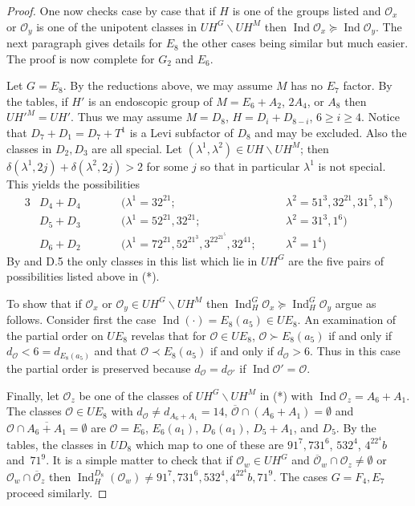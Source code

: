 \documentclass{amsart}
\newcommand\Ind	{\operatorname{Ind}}
\newcommand\lam	{\lambda}
\newcommand\cO		{{\mathcal O}}
\begin{document}
\begin{proof}
One now checks case by case that if $H$ is one of the groups
listed and
$\cO_x$ or $\cO_y$ is one of the unipotent classes in $UH^G
\backslash UH^M$
then $\Ind \cO_x \succeq \Ind \cO_y$.  The next paragraph gives
details for
$E_8$ the other cases being similar but much easier.  The proof
is now
complete for $G_2$ and $E_6$.

Let $G = E_8$.  By the reductions above, we may assume $M$ has no
$E_7$
factor.  By the tables, if $H'$ is an endoscopic group of $M =
E_6 + A_2$,
$2A_4$, or $A_8$ then $U{H'}^M = UH'$.  Thus we may assume $M =
D_8$,
$H = D_i + D_{8-i}$, $6 \ge i \ge 4$.  Notice that $D_7 + D_1 =
D_7 + T^1$
is a Levi subfactor of $D_8$ and may be excluded.  Also the
classes in
$D_2,D_3$ are all special.  Let $(\lam^1,\lam^2) \in UH
\backslash UH^M$;
then $\delta(\lam^1,2j) + \delta(\lam^2,2j) > 2$ for some $j$ so
that
in particular $\lam^1$ is not special.  This yields the
possibilities
     \begin{alignat*} {3}
     &D_4 + D_4 &\qquad &(\lam^1 = 32^21; 
          &\quad &\lam^2 = 51^3,32^21,31^5,1^8) \\
     &D_5 + D_3 &\qquad &(\lam^1 = 52^21,32^21;
          &\quad &\lam^2 = 31^3,1^6) \\
     &D_6 + D_2 &\qquad &(\lam^1 = 72^21,52^21^3,3^22^21^5,32^41;
          &\quad &\lam^2 = 1^4)
     \end{alignat*}
By \cite{A} and D.5 the only classes in this list which lie in
$UH^G$ are
the five pairs of possibilities listed above in (*).

To show that if $\cO_x$ or $\cO_y \in UH^G \backslash UH^M$ then
$\Ind_H^G \cO_x \succeq \Ind_H^G \cO_y$ argue as follows.  Consider
first the
case $\Ind(\cdot) = E_8(a_5) \in UE_8$.  An examination of the
partial order
on $UE_8$ revelas that for $\cO \in UE_8$, $\cO \succ E_8(a_5)$ if
and only
if $d_\cO < 6 = d_{E_8(a_5)}$ and that $\cO \prec E_8(a_5)$ if and
only if
$d_\cO > 6$.  Thus in this case the partial order is preserved
because
$d_\cO = d_{\cO'}$ if $\Ind \cO' = \cO$.

Finally, let $\cO_z$ be one of the classes of $UH^G \backslash
UH^M$ in (*)
with $\Ind \cO_z = A_6 + A_1$.  The classes $\cO \in UE_8$ with 
$d_\cO \ne d_{A_6 + A_1} = 14$, $\overline{\cO} \cap (A_6 + A_1) =
\emptyset$
and $\cO \cap \overline{A_6 + A_1} = \emptyset$ are $\cO = E_6$, 
$E_6(a_1)$, $D_6(a_1)$, $D_5 + A_1$, and $D_5$.  By the tables,
the classes
in $UD_8$ which map to one of these are $91^7,731^6$, $532^4$,
$4^22^4b$
and~$71^9$.  It is a simple matter to check that if $\cO_w \in
UH^G$
and $\overline{\cO}_w \cap \cO_z \ne \emptyset$ or $\cO_w \cap
\overline{\cO}_z$
then $\Ind_H^{D_8} (\cO_w) \ne 91^7,731^6,532^4,4^22^4b,71^9$. 
The
cases $G = F_4,E_7$ proceed similarly.
\end{proof}
\vfill\newpage
\end{document}

